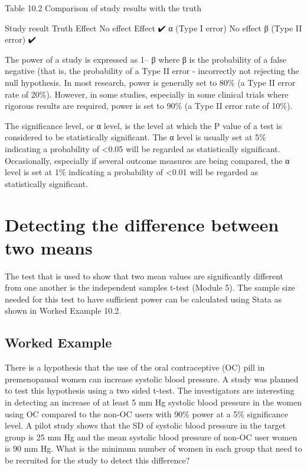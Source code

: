 \documentclass[
]{memoir}
\begin{document}
Table 10.2 Comparison of study results with the truth

Study result Truth
Effect No effect
Effect ✔️ α (Type I error)
No effect β (Type II error) ✔️

The power of a study is expressed as 1-- β where β is the probability of a false negative (that is, the probability of a Type II error - incorrectly not rejecting the null hypothesis. In most research, power is generally set to 80\% (a Type II error rate of 20\%). However, in some studies, especially in some clinical trials where rigorous results are required, power is set to 90\% (a Type II error rate of 10\%).

The significance level, or α level, is the level at which the P value of a test is considered to be statistically significant. The α level is usually set at 5\% indicating a probability of \textless0.05 will be regarded as statistically significant. Occasionally, especially if several outcome measures are being compared, the α level is set at 1\% indicating a probability of \textless0.01 will be regarded as statistically significant.

\hypertarget{detecting-the-difference-between-two-means}{%
\section{Detecting the difference between two means}\label{detecting-the-difference-between-two-means}}

The test that is used to show that two mean values are significantly different from one another is the independent samples t-test (Module 5). The sample size needed for this test to have sufficient power can be calculated using Stata as shown in Worked Example 10.2.

\hypertarget{worked-example-8}{%
\subsection{Worked Example}\label{worked-example-8}}

There is a hypothesis that the use of the oral contraceptive (OC) pill in premenopausal women can increase systolic blood pressure. A study was planned to test this hypothesis using a two sided t-test. The investigators are interesting in detecting an increase of at least 5 mm Hg systolic blood pressure in the women using OC compared to the non-OC users with 90\% power at a 5\% significance level. A pilot study shows that the SD of systolic blood pressure in the target group is 25 mm Hg and the mean systolic blood pressure of non-OC user women is 90 mm Hg. What is the minimum number of women in each group that need to be recruited for the study to detect this difference?
\end{document}
